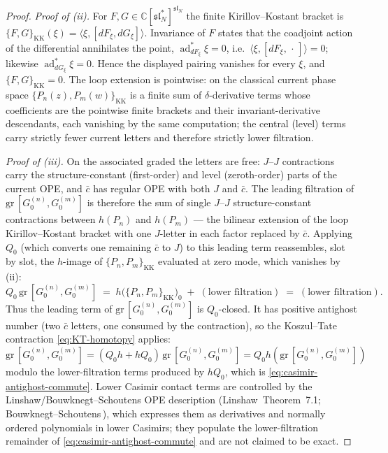 \begin{proof}
\emph{Proof of \textup{(ii)}.} For
$F,G\in\mathbb C[\mathfrak{sl}_N^*]^{\mathfrak{sl}_N}$ the finite
Kirillov--Kostant bracket is
$\{F,G\}_{\mathrm{KK}}(\xi)=\langle \xi,[dF_\xi,dG_\xi]\rangle$.
Invariance of $F$ states that the coadjoint action of the
differential annihilates the point,
$\operatorname{ad}^*_{dF_\xi}\xi=0$, i.e.\
$\langle\xi,[dF_\xi,\,\cdot\,]\rangle=0$; likewise
$\operatorname{ad}^*_{dG_\xi}\xi=0$. Hence the displayed pairing
vanishes for every $\xi$, and $\{F,G\}_{\mathrm{KK}}=0$. The loop
extension is pointwise: on the classical current phase space
$\{P_n(z),P_m(w)\}_{\mathrm{KK}}$ is a finite sum of
$\delta$-derivative terms whose coefficients are the pointwise finite
brackets and their invariant-derivative descendants, each vanishing by
the same computation; the central (level) terms carry strictly fewer
current letters and therefore strictly lower filtration.

\emph{Proof of \textup{(iii)}.} On the associated graded the letters
are free: $J$--$J$ contractions carry the structure-constant
(first-order) and level (zeroth-order) parts of the current OPE, and
$\bar c$ has regular OPE with both $J$ and $\bar c$. The leading
filtration of $\mathrm{gr}\,[G^{(n)}_0,G^{(m)}_0]$ is therefore the
sum of single $J$--$J$ structure-constant contractions between
$h(P_n)$ and $h(P_m)$ --- the bilinear extension of the loop
Kirillov--Kostant bracket with one $J$-letter in each factor replaced
by $\bar c$. Applying $Q_0$ (which converts one remaining $\bar c$
to $J$) to this leading term reassembles, slot by slot, the
$h$-image of $\{P_n,P_m\}_{\mathrm{KK}}$ evaluated at zero mode,
which vanishes by \textup{(ii)}:
\begin{equation}\label{eq:casimir-poisson-zero}
Q_0\,\mathrm{gr}\,[G^{(n)}_0,G^{(m)}_0]
\;=\;
h\bigl(\{P_n,P_m\}_{\mathrm{KK}}\bigr)_0
\;+\;(\text{lower filtration})
\;=\;(\text{lower filtration}).
\end{equation}
Thus the leading term of $\mathrm{gr}\,[G^{(n)}_0,G^{(m)}_0]$ is
$Q_0$-closed. It has positive antighost number (two $\bar c$
letters, one consumed by the contraction), so the Koszul--Tate
contraction \eqref{eq:KT-homotopy} applies:
$\mathrm{gr}\,[G^{(n)}_0,G^{(m)}_0]
=(Q_0h+hQ_0)\,\mathrm{gr}\,[G^{(n)}_0,G^{(m)}_0]
=Q_0h(\mathrm{gr}\,[G^{(n)}_0,G^{(m)}_0])$ modulo the lower-filtration
terms produced by $hQ_0$, which is \eqref{eq:casimir-antighost-commute}.
Lower Casimir contact terms are controlled by the
Linshaw/Bouwknegt--Schoutens OPE description
\textup{(}Linshaw\,\cite{Linshaw-Winfty} Theorem~7.1;
Bouwknegt--Schoutens\,\cite{BMP-Wsymmetry}\textup{)}, which expresses
them as derivatives and normally ordered polynomials in lower
Casimirs; they populate the lower-filtration remainder of
\eqref{eq:casimir-antighost-commute} and are not claimed to be
exact.


\end{proof}
